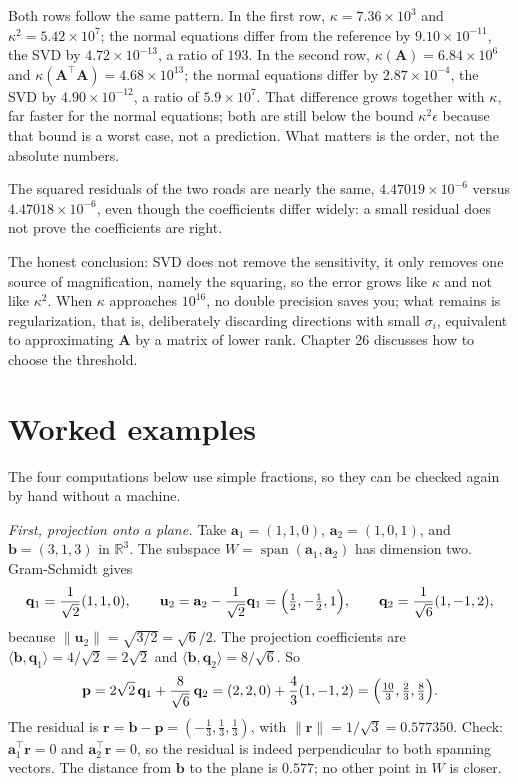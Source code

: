 Both rows follow the same pattern. In the first row, $\kappa=7.36\times10^{3}$ and
$\kappa^{2}=5.42\times10^{7}$; the normal equations differ from the
reference by $9.10\times10^{-11}$, the SVD by $4.72\times10^{-13}$, a ratio of $193$. In the second row,
$\kappa(\mathbf{A})=6.84\times10^{6}$ and $\kappa(\mathbf{A}^{\top}\mathbf{A})
=4.68\times10^{13}$; the normal equations differ by $2.87\times10^{-4}$, the SVD
by $4.90\times10^{-12}$, a ratio of $5.9\times10^{7}$. That difference grows together with
$\kappa$, far faster for the normal equations; both are still below the bound
$\kappa^{2}\epsilon$ because that bound is a worst case, not a prediction. What matters is the
order, not the absolute numbers.

The squared residuals of the two roads are nearly the same, $4.47019\times10^{-6}$ versus
$4.47018\times10^{-6}$, even though the coefficients differ widely: a small residual does not prove the
coefficients are right.

The honest conclusion: SVD does not remove the sensitivity, it only removes one source of
magnification, namely the squaring, so the error grows like $\kappa$ and not like
$\kappa^{2}$. When $\kappa$ approaches $10^{16}$, no double precision
saves you; what remains is regularization, that is, deliberately discarding directions with
small $\sigma_{i}$, equivalent to approximating $\mathbf{A}$ by a matrix of lower
rank. Chapter 26 discusses how to choose the threshold.

\section{Worked examples}

The four computations below use simple fractions, so they can be checked again by
hand without a machine.

\emph{First, projection onto a plane.} Take
$\mathbf{a}_{1}=(1,1,0)$, $\mathbf{a}_{2}=(1,0,1)$, and $\mathbf{b}=(3,1,3)$ in
$\mathbb{R}^{3}$. The subspace $W=\operatorname{span}(\mathbf{a}_{1},\mathbf{a}_{2})$
has dimension two. Gram-Schmidt gives
\[
  \mathbf{q}_{1}=\frac{1}{\sqrt{2}}(1,1,0),\qquad
  \mathbf{u}_{2}=\mathbf{a}_{2}-\frac{1}{\sqrt{2}}\mathbf{q}_{1}
  =\Bigl(\tfrac12,-\tfrac12,1\Bigr),\qquad
  \mathbf{q}_{2}=\frac{1}{\sqrt{6}}(1,-1,2),
\]
because $\|\mathbf{u}_{2}\|=\sqrt{3/2}=\sqrt{6}/2$. The projection coefficients are
$\langle\mathbf{b},\mathbf{q}_{1}\rangle=4/\sqrt{2}=2\sqrt{2}$ and
$\langle\mathbf{b},\mathbf{q}_{2}\rangle=8/\sqrt{6}$. So
\[
  \mathbf{p}=2\sqrt{2}\,\mathbf{q}_{1}+\frac{8}{\sqrt{6}}\,\mathbf{q}_{2}
  =(2,2,0)+\frac{4}{3}(1,-1,2)
  =\Bigl(\tfrac{10}{3},\tfrac23,\tfrac83\Bigr).
\]
The residual is $\mathbf{r}=\mathbf{b}-\mathbf{p}=(-\tfrac13,\tfrac13,\tfrac13)$, with
$\|\mathbf{r}\|=1/\sqrt{3}=0.577350$. Check: $\mathbf{a}_{1}^{\top}\mathbf{r}=0$
and $\mathbf{a}_{2}^{\top}\mathbf{r}=0$, so the residual is indeed perpendicular to both spanning vectors.
The distance from $\mathbf{b}$ to the plane is $0.577$; no other point in $W$ is closer.

